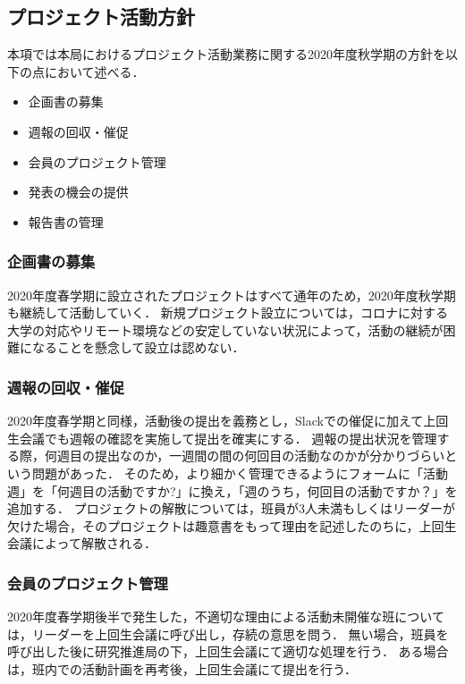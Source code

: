 \subsection*{プロジェクト活動方針}


本項では本局におけるプロジェクト活動業務に関する2020年度秋学期の方針を以下の点において述べる．

\begin{itemize}
\item 企画書の募集
\item 週報の回収・催促
\item 会員のプロジェクト管理
\item 発表の機会の提供
\item 報告書の管理
\end{itemize}

\subsubsection*{企画書の募集}

2020年度春学期に設立されたプロジェクトはすべて通年のため，2020年度秋学期も継続して活動していく．
新規プロジェクト設立については，コロナに対する大学の対応やリモート環境などの安定していない状況によって，活動の継続が困難になることを懸念して設立は認めない．

\subsubsection*{週報の回収・催促}

2020年度春学期と同様，活動後の提出を義務とし，Slackでの催促に加えて上回生会議でも週報の確認を実施して提出を確実にする．
週報の提出状況を管理する際，何週目の提出なのか，一週間の間の何回目の活動なのかが分かりづらいという問題があった．
そのため，より細かく管理できるようにフォームに「活動週」を「何週目の活動ですか?」に換え，「週のうち，何回目の活動ですか？」を追加する．
プロジェクトの解散については，班員が3人未満もしくはリーダーが欠けた場合，そのプロジェクトは趣意書をもって理由を記述したのちに，上回生会議によって解散される．

\subsubsection*{会員のプロジェクト管理}

2020年度春学期後半で発生した，不適切な理由による活動未開催な班については，リーダーを上回生会議に呼び出し，存続の意思を問う．
無い場合，班員を呼び出した後に研究推進局の下，上回生会議にて適切な処理を行う．
ある場合は，班内での活動計画を再考後，上回生会議にて提出を行う．

